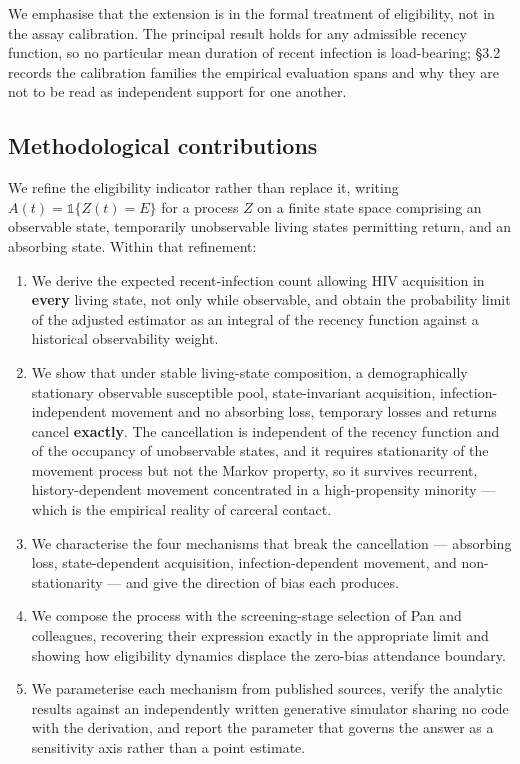 We emphasise that the extension is in the formal treatment of eligibility, not in the assay calibration. The principal result holds for any admissible recency function, so no particular mean duration of recent infection is load-bearing; §3.2 records the calibration families the empirical evaluation spans and why they are not to be read as independent support for one another.

\subsection{Methodological contributions}

We refine the eligibility indicator rather than replace it, writing \(A(t)=\mathbb{1}\{Z(t)=E\}\) for a process \(Z\) on a finite state space comprising an observable state, temporarily unobservable living states permitting return, and an absorbing state. Within that refinement:

\begin{enumerate}
\def\labelenumi{\arabic{enumi}.}
\item
  We derive the expected recent-infection count allowing HIV acquisition in \textbf{every} living state, not only while observable, and obtain the probability limit of the adjusted estimator as an integral of the recency function against a historical observability weight.
\item
  We show that under stable living-state composition, a demographically stationary observable susceptible pool, state-invariant acquisition, infection-independent movement and no absorbing loss, temporary losses and returns cancel \textbf{exactly}. The cancellation is independent of the recency function and of the occupancy of unobservable states, and it requires stationarity of the movement process but not the Markov property, so it survives recurrent, history-dependent movement concentrated in a high-propensity minority --- which is the empirical reality of carceral contact.
\item
  We characterise the four mechanisms that break the cancellation --- absorbing loss, state-dependent acquisition, infection-dependent movement, and non-stationarity --- and give the direction of bias each produces.
\item
  We compose the process with the screening-stage selection of Pan and colleagues, recovering their expression exactly in the appropriate limit and showing how eligibility dynamics displace the zero-bias attendance boundary.
\item
  We parameterise each mechanism from published sources, verify the analytic results against an independently written generative simulator sharing no code with the derivation, and report the parameter that governs the answer as a sensitivity axis rather than a point estimate.
\end{enumerate}


